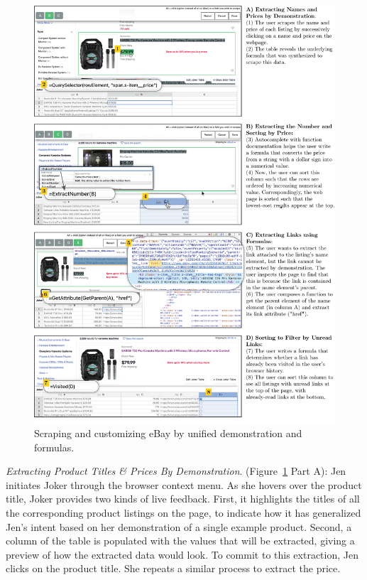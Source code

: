 \documentclass[sigconf,10pt]{acmart}
\begin{document}
\begin{figure}
  \includegraphics[width=\textwidth]{media/ebay.png}
  \caption{\label{fig:ebay}Scraping and customizing eBay by unified demonstration and formulas.}
\end{figure}

\emph{Extracting Product Titles \& Prices By Demonstration}.
(Figure~\ref{fig:ebay} Part A): Jen initiates Joker through the browser
context menu. As she hovers over the product title, Joker provides two
kinds of live feedback. First, it highlights the titles of all the
corresponding product listings on the page, to indicate how it has
generalized Jen's intent based on her demonstration of a single example
product. Second, a column of the table is populated with the values that
will be extracted, giving a preview of how the extracted data would
look. To commit to this extraction, Jen clicks on the product title. She
repeats a similar process to extract the price.
\end{document}

